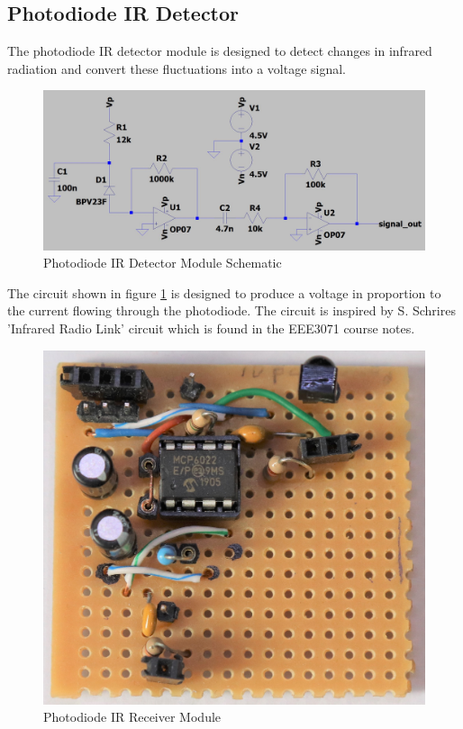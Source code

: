 \subsection{Photodiode IR Detector}

The photodiode IR detector module is designed to detect changes in infrared radiation and convert these fluctuations into a voltage signal.

\begin{figure}[H]
	\centering
	\includegraphics[width=.8\textwidth]{figures/design/photodiode_transimpedance.JPG}
	\caption{Photodiode IR Detector Module Schematic}
	\label{fig:schematic_photodiode_transimpedance}
\end{figure}

The circuit shown in figure \ref{fig:schematic_photodiode_transimpedance} is designed to produce a voltage in proportion to the current flowing through the photodiode. The circuit is inspired by S. Schrires 'Infrared Radio Link' circuit which is found in the EEE3071 course notes\cite{Schrire2007}.


\begin{figure}[H]
	\centering
	\includegraphics[width=.6\textwidth]{figures/modules/photodiode_receiver.jpg}
	\caption{Photodiode IR Receiver Module}
	\label{fig:module_photodiode_receiver}
\end{figure}

